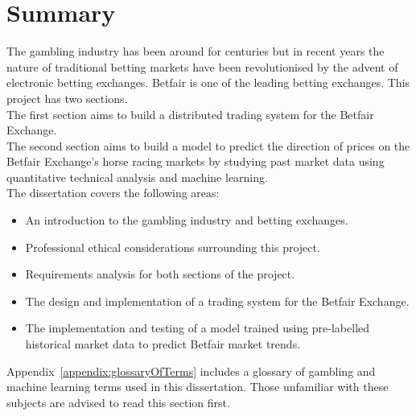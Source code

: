 \chapter{Summary}
	The gambling industry has been around for centuries but in recent years the nature of traditional betting markets have been revolutionised by the advent of electronic betting exchanges. Betfair is one of the leading betting exchanges. This project has two sections.\\

The first section aims to build a distributed trading system for the Betfair Exchange.\\

The second section aims to build a model to predict the direction of prices on the Betfair Exchange's horse racing markets by studying past market data using quantitative technical analysis and machine learning.\\

The dissertation covers the following areas:

	\begin{itemize}
		\item An introduction to the gambling industry and betting exchanges.
		\item Professional ethical considerations surrounding this project.
		\item Requirements analysis for both sections of the project.
		\item The design and implementation of a trading system for the Betfair Exchange.
		\item The implementation and testing of a model trained using pre-labelled historical market data to predict Betfair market trends.
	\end{itemize}

Appendix~\ref{appendix:glossaryOfTerms} includes a glossary of gambling and machine learning terms used in this dissertation. Those unfamiliar with these subjects are advised to read this section first.